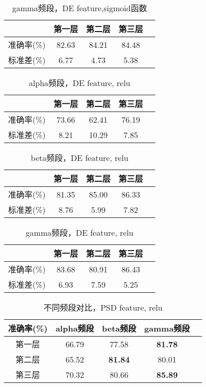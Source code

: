 		\begin{table}[!h]
	\centering
\begin{tabular}{|c|c|c|c|c|}
\hline
\hline
  & 第一层 & 第二层 & 第三层 \\
\hline
准确率(\%) & 82.63 & 84.21 & 84.48\\
\hline
标准差(\%) & 6.77 & 4.73 & 5.38 \\
\hline
\end{tabular}
\caption{gamma频段，DE feature,sigmoid函数}
\end{table} 




		\begin{table}[!h]
	\centering
\begin{tabular}{|c|c|c|c|c|}
\hline
\hline
  & 第一层 & 第二层 & 第三层 \\
\hline
准确率(\%) & 73.66 & 62.41 & 76.19\\
\hline
标准差(\%) & 8.21 & 10.29 & 7.85 \\
\hline
\end{tabular}
\caption{alpha频段，DE feature, relu}
\end{table} 

		\begin{table}[!h]
	\centering
\begin{tabular}{|c|c|c|c|c|}
\hline
\hline
  & 第一层 & 第二层 & 第三层 \\
\hline
准确率(\%) & 81.35 & 85.00 & 86.33\\
\hline
标准差(\%) & 8.76 & 5.99 & 7.82 \\
\hline
\end{tabular}
\caption{beta频段，DE feature, relu}
\end{table} 

		\begin{table}[!h]
	\centering
\begin{tabular}{|c|c|c|c|c|}
\hline
\hline
  & 第一层 & 第二层 & 第三层 \\
\hline
准确率(\%) &83.68 & 80.91 &86.43\\
\hline
标准差(\%) & 6.93 & 7.59 & 5.25 \\
\hline
\end{tabular}
\caption{gamma频段，DE feature, relu}
\end{table} 

		\begin{table}[!h]
	\centering
\begin{tabular}{|c|c|c|c|c|}
\hline
\hline
 准确率(\%) & alpha频段 & beta频段 & gamma频段\\
\hline
第一层 & 66.79	& 77.58 & \textbf{81.78}\\
\hline
第二层 & 65.52	& \textbf{81.84} & 80.01 \\
\hline
第三层 & 70.32 & 80.66 & \textbf{85.89}\\
\hline
\end{tabular}
\caption{不同频段对比，PSD feature, relu}
\end{table} 


